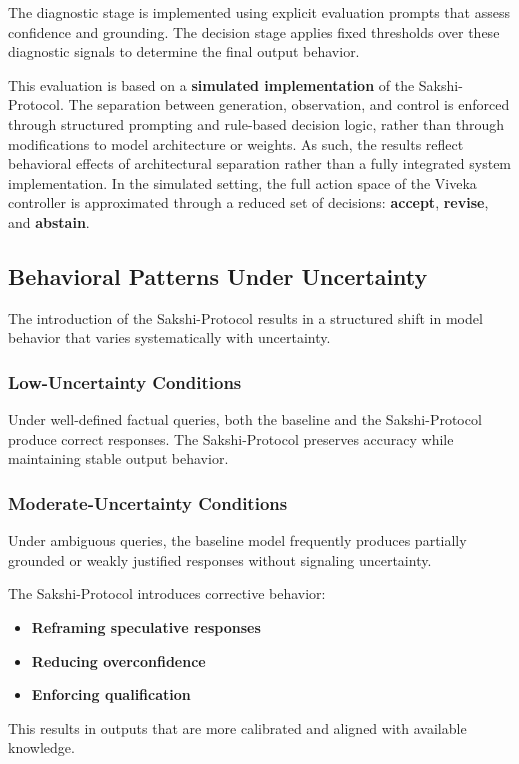 \documentclass[12pt,a4paper]{article}
\begin{document}
The diagnostic stage is implemented using explicit evaluation prompts that assess confidence and grounding. The decision stage applies fixed thresholds over these diagnostic signals to determine the final output behavior.

This evaluation is based on a \textbf{simulated implementation} of the Sakshi-Protocol. The separation between generation, observation, and control is enforced through structured prompting and rule-based decision logic, rather than through modifications to model architecture or weights. As such, the results reflect behavioral effects of architectural separation rather than a fully integrated system implementation. In the simulated setting, the full action space of the Viveka controller is approximated through a reduced set of decisions: \textbf{accept}, \textbf{revise}, and \textbf{abstain}.

\subsection{Behavioral Patterns Under Uncertainty}
The introduction of the Sakshi-Protocol results in a structured shift in model behavior that varies systematically with uncertainty.

\subsubsection*{Low-Uncertainty Conditions}
Under well-defined factual queries, both the baseline and the Sakshi-Protocol produce correct responses. The Sakshi-Protocol preserves accuracy while maintaining stable output behavior.

\subsubsection*{Moderate-Uncertainty Conditions}
Under ambiguous queries, the baseline model frequently produces partially grounded or weakly justified responses without signaling uncertainty.

The Sakshi-Protocol introduces corrective behavior:
\begin{itemize}
    \item \textbf{Reframing speculative responses}
    \item \textbf{Reducing overconfidence}
    \item \textbf{Enforcing qualification}
\end{itemize}

This results in outputs that are more calibrated and aligned with available knowledge.
\end{document}
